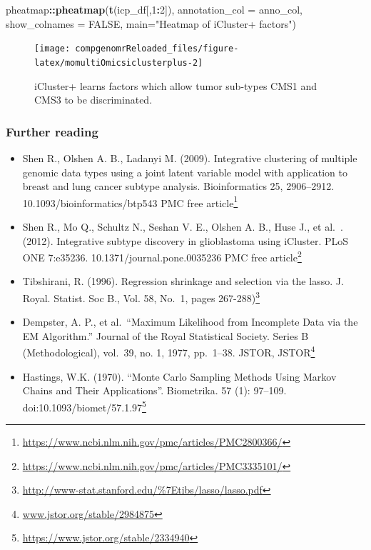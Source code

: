 \documentclass[12pt,]{krantz}
\newenvironment{Shaded}{\begin{snugshade}}{\end{snugshade}}
\newcommand{\DataTypeTok}[1]{\textcolor[rgb]{0.13,0.29,0.53}{#1}}
\newcommand{\DecValTok}[1]{\textcolor[rgb]{0.00,0.00,0.81}{#1}}
\newcommand{\KeywordTok}[1]{\textcolor[rgb]{0.13,0.29,0.53}{\textbf{#1}}}
\newcommand{\NormalTok}[1]{#1}
\newcommand{\OperatorTok}[1]{\textcolor[rgb]{0.81,0.36,0.00}{\textbf{#1}}}
\newcommand{\OtherTok}[1]{\textcolor[rgb]{0.56,0.35,0.01}{#1}}
\newcommand{\StringTok}[1]{\textcolor[rgb]{0.31,0.60,0.02}{#1}}
\providecommand{\tightlist}{%
  \setlength{\itemsep}{0pt}\setlength{\parskip}{0pt}}
\renewcommand{\href}[2]{#2\footnote{\url{#1}}}
\begin{document}
\begin{Shaded}
\begin{Highlighting}[]
\NormalTok{pheatmap}\OperatorTok{::}\KeywordTok{pheatmap}\NormalTok{(}\KeywordTok{t}\NormalTok{(icp_df[,}\DecValTok{1}\OperatorTok{:}\DecValTok{2}\NormalTok{]), }\DataTypeTok{annotation_col =}\NormalTok{ anno_col, }\DataTypeTok{show_colnames =} \OtherTok{FALSE}\NormalTok{, }\DataTypeTok{main=}\StringTok{"Heatmap of iCluster+ factors"}\NormalTok{)}
\end{Highlighting}
\end{Shaded}

\begin{figure}

{\centering \texttt{[image: compgenomrReloaded\_files/figure-latex/momultiOmicsiclusterplus-2]} 

}

\caption{iCluster+ learns factors which allow tumor sub-types CMS1 and CMS3 to be discriminated.}\label{fig:momultiOmicsiclusterplus2}
\end{figure}

\hypertarget{further-reading-2}{%
\subsubsection{Further reading}\label{further-reading-2}}

\begin{itemize}
\tightlist
\item
  Shen R., Olshen A. B., Ladanyi M. (2009). Integrative clustering of multiple genomic data types using a joint latent variable model with application to breast and lung cancer subtype analysis. Bioinformatics 25, 2906--2912. 10.1093/bioinformatics/btp543 \href{https://www.ncbi.nlm.nih.gov/pmc/articles/PMC2800366/}{PMC free article}
\item
  Shen R., Mo Q., Schultz N., Seshan V. E., Olshen A. B., Huse J., et al.~. (2012). Integrative subtype discovery in glioblastoma using iCluster. PLoS ONE 7:e35236. 10.1371/journal.pone.0035236 \href{https://www.ncbi.nlm.nih.gov/pmc/articles/PMC3335101/}{PMC free article}
\item
  \href{http://www-stat.stanford.edu/\%7Etibs/lasso/lasso.pdf}{Tibshirani, R. (1996). Regression shrinkage and selection via the lasso. J. Royal. Statist. Soc B., Vol. 58, No.~1, pages 267-288)}
\item
  \href{www.jstor.org/stable/2984875}{Dempster, A. P., et al.~``Maximum Likelihood from Incomplete Data via the EM Algorithm.'' Journal of the Royal Statistical Society. Series B (Methodological), vol.~39, no. 1, 1977, pp.~1--38. JSTOR, JSTOR}
\item
  \href{https://www.jstor.org/stable/2334940}{Hastings, W.K. (1970). ``Monte Carlo Sampling Methods Using Markov Chains and Their Applications''. Biometrika. 57 (1): 97--109. doi:10.1093/biomet/57.1.97}
\end{itemize}
\end{document}

